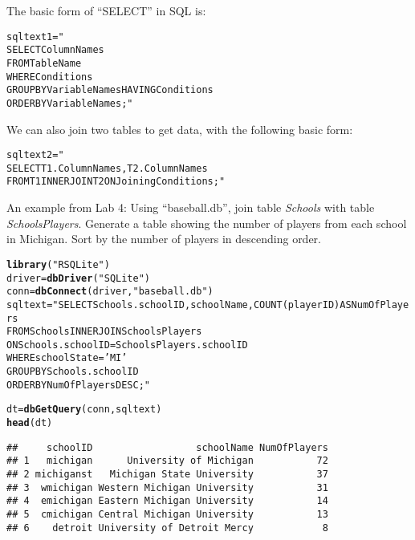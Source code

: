 \documentclass[12pt]{article}\usepackage[]{graphicx}\usepackage[]{color}
\makeatletter
\newcommand{\hlstr}[1]{\textcolor[rgb]{0.192,0.494,0.8}{#1}}%
\newcommand{\hlstd}[1]{\textcolor[rgb]{0.345,0.345,0.345}{#1}}%
\newcommand{\hlkwb}[1]{\textcolor[rgb]{0.69,0.353,0.396}{#1}}%
\newcommand{\hlkwd}[1]{\textcolor[rgb]{0.737,0.353,0.396}{\textbf{#1}}}%
\newenvironment{kframe}{%
 \def\at@end@of@kframe{}%
 \ifinner\ifhmode%
  \def\at@end@of@kframe{\end{minipage}}%
  \begin{minipage}{\columnwidth}%
 \fi\fi%
 \def\FrameCommand##1{\hskip\@totalleftmargin \hskip-\fboxsep
 \colorbox{shadecolor}{##1}\hskip-\fboxsep
     \hskip-\linewidth \hskip-\@totalleftmargin \hskip\columnwidth}%
 \MakeFramed {\advance\hsize-\width
   \@totalleftmargin\z@ \linewidth\hsize
   \@setminipage}}%
 {\par\unskip\endMakeFramed%
 \at@end@of@kframe}
\newenvironment{knitrout}{}{} %
\makeatother
\begin{document}
The basic form of ``SELECT'' in SQL is:
\begin{knitrout}
\color{fgcolor}\begin{kframe}
\begin{alltt}
\hlstd{sqltext1}\hlkwb{=}\hlstr{"
SELECT ColumnNames
FROM TableName
WHERE Conditions
GROUP BY VariableNames HAVING Conditions
ORDER BY VariableNames;"}
\end{alltt}
\end{kframe}
\end{knitrout}
We can also join two tables to get data, with the following basic form:
\begin{knitrout}
\color{fgcolor}\begin{kframe}
\begin{alltt}
\hlstd{sqltext2}\hlkwb{=}\hlstr{"
SELECT T1.ColumnNames, T2.ColumnNames
FROM T1 INNER JOIN T2 ON JoiningConditions;"}
\end{alltt}
\end{kframe}
\end{knitrout}
An example from Lab 4: Using ``baseball.db'', join table \emph{Schools} with table \emph{SchoolsPlayers}. Generate a table showing the number of players from each school in Michigan. Sort by the number of players in descending order.
\begin{knitrout}
\color{fgcolor}\begin{kframe}
\begin{alltt}
\hlkwd{library}\hlstd{(}\hlstr{"RSQLite"}\hlstd{)}
\hlstd{driver} \hlkwb{=} \hlkwd{dbDriver}\hlstd{(}\hlstr{"SQLite"}\hlstd{)}
\hlstd{conn} \hlkwb{=} \hlkwd{dbConnect}\hlstd{(driver,} \hlstr{"baseball.db"}\hlstd{)}
\hlstd{sqltext}\hlkwb{=}\hlstr{"SELECT Schools.schoolID, schoolName, COUNT(playerID) AS NumOfPlayers 
                FROM Schools INNER JOIN SchoolsPlayers 
                ON Schools.schoolID = SchoolsPlayers.schoolID 
                WHERE schoolState = 'MI' 
                GROUP BY Schools.schoolID 
                ORDER BY NumOfPlayers DESC;"}

\hlstd{dt} \hlkwb{=} \hlkwd{dbGetQuery}\hlstd{(conn,sqltext)}
\hlkwd{head}\hlstd{(dt)}
\end{alltt}
\begin{verbatim}
##     schoolID                  schoolName NumOfPlayers
## 1   michigan      University of Michigan           72
## 2 michiganst   Michigan State University           37
## 3  wmichigan Western Michigan University           31
## 4  emichigan Eastern Michigan University           14
## 5  cmichigan Central Michigan University           13
## 6    detroit University of Detroit Mercy            8
\end{verbatim}
\end{kframe}
\end{knitrout}
\end{document}

